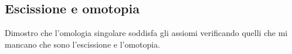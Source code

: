 




\subsection{Escissione e omotopia}

Dimostro che l'omologia singolare soddisfa gli assiomi verificando quelli
che mi mancano che sono l'escissione e l'omotopia.

